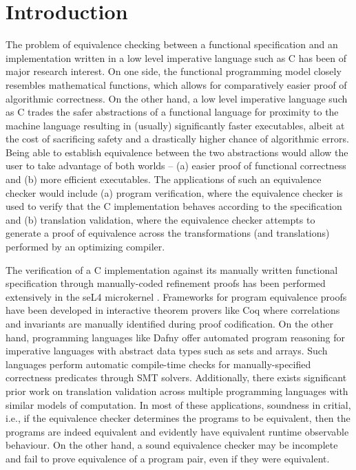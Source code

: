 \chapter{Introduction}
\label{sec:intro}
The problem of equivalence checking between a functional specification and an
implementation written in a low level imperative language such as C
has been of major research interest.
On one side, the functional programming model closely resembles mathematical functions,
which allows for comparatively easier proof of algorithmic correctness.
On the other hand, a low level imperative language such as C trades the safer abstractions of a functional
language for proximity to the machine language resulting in (usually) significantly faster executables, albeit at the cost of
sacrificing safety and a drastically higher chance of algorithmic errors.
Being able to establish equivalence between the two abstractions would allow the user
to take advantage of both worlds -- (a) easier proof of functional correctness and
(b) more efficient executables.
The applications of such an equivalence checker would include (a) program verification, where
the equivalence checker is used to verify that the C implementation
behaves according to the specification and (b) translation validation, where
the equivalence checker attempts to generate a proof of equivalence across
the transformations (and translations) performed by an optimizing compiler.

The verification of a C implementation against its manually written
functional specification through manually-coded refinement proofs has been
performed extensively in the seL4 microkernel \cite{seL4}.
Frameworks for program equivalence proofs have been developed in interactive
theorem provers like Coq \cite{programEquivalenceInCoq} where correlations and invariants
are manually identified during proof codification.
On the other hand, programming languages like Dafny \cite{dafny} offer automated program
reasoning for imperative languages with abstract data types such as sets and arrays.
Such languages perform automatic compile-time checks for manually-specified
correctness predicates through SMT solvers.
Additionally, there exists significant prior work on translation validation
\cite{tvi,tristan_tv_eqsat11,stepp_eqsat_llvm11,eqsat,pec,zuck03,zuck05,heffter05,covac,c_to_verilog,kanade09,lopes16,tvoc_cav05,ddec,semalign,oopsla20,tv_oskernel,namjoshi13}
across multiple programming languages with similar models of computation.
In most of these applications, soundness in critial,
i.e., if the equivalence checker determines the programs to be equivalent, then the programs are indeed equivalent
and evidently have equivalent runtime observable behaviour. On the other hand, a sound equivalence checker may be incomplete
and fail to prove equivalence of a program pair, even if they were equivalent.


